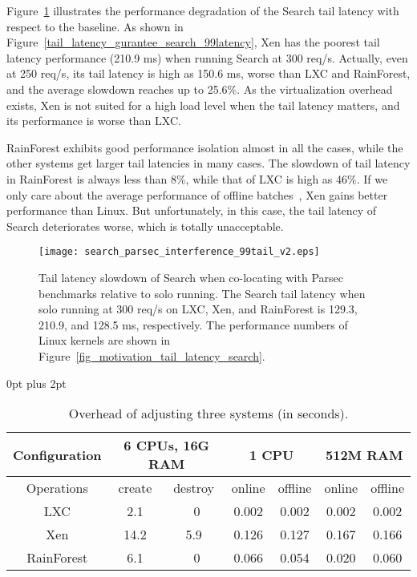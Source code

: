 \documentclass[pageno]{jpaper}
\begin{document}
Figure~\ref{fig_tail_latency_parsec} illustrates the performance degradation of the Search tail latency with respect to the baseline. As shown in  Figure~\ref{tail_latency_gurantee_search_99latency}, Xen has the poorest tail latency performance (210.9 ms) when running Search at 300 req/s. Actually, even at 250 req/s, its tail latency is high as 150.6 ms, worse than LXC and RainForest, and the average slowdown reaches up to 25.6\%. As the virtualization overhead exists, Xen is not suited for a high load level when the tail latency matters, and its performance is worse than LXC.

RainForest exhibits good performance isolation almost in all the cases, while the other systems get larger tail latencies in many cases. The slowdown of tail latency in RainForest is always less than 8\%, while that of LXC is high as 46\%. If we only care about the average performance of offline batches~\cite{barham2003xen}, Xen gains better performance than Linux. But unfortunately, in this case, the tail latency of Search deteriorates worse, which is totally unacceptable.








\begin{figure}[t]
\setlength{\abovecaptionskip}{3pt}
\setlength{\belowcaptionskip}{0pt}
  \centering
\texttt{[image: search\_parsec\_interference\_99tail\_v2.eps]}  \caption{Tail latency slowdown of Search when co-locating with Parsec benchmarks relative to solo running. The Search tail latency when solo running at 300 req/s  on LXC, Xen, and RainForest is 129.3, 210.9, and 128.5 ms, respectively. The performance numbers of Linux kernels are shown in Figure~\ref{fig_motivation_tail_latency_search}.}
  \label{fig_tail_latency_parsec}
\end{figure}


\begin{table}[t]
\renewcommand{\arraystretch}{1.1}
\setlength{\abovecaptionskip}{3pt}
\setlength{\belowcaptionskip}{0pt}
\setlength{\textfloatsep} {0pt plus 2pt}
\setlength{\tabcolsep}{5pt}
\centering
\label{table_elastic_partition}
\caption{Overhead of adjusting three systems (in seconds).}
\label{table_elastic_partition}
\begin{lrbox}{\tablebox}
\begin{tabular}{|c|c|c|c|c|c|c|}
\hline
Configuration & \multicolumn{2}{c|}{6 CPUs, 16G RAM} & \multicolumn{2}{c|}{1 CPU} & \multicolumn{2}{c|}{512M RAM} \\ \hline
Operations & create & destroy & online & offline & online & offline \\ \hline
LXC & 2.1 & ~0 & 0.002 & 0.002 & 0.002 & 0.002 \\ \hline
Xen & 14.2 & 5.9 & 0.126 & 0.127 & 0.167 & 0.166 \\ \hline
RainForest & 6.1 & ~0 & 0.066 & 0.054 & 0.020 & 0.060 \\ \hline
\end{tabular}
\end{lrbox}
\scalebox{0.8}{\usebox{\tablebox}}
\end{table}
\end{document}
